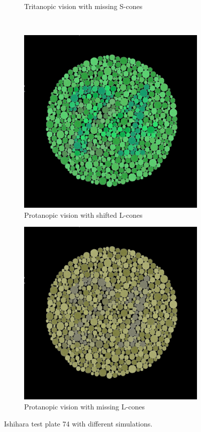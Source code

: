 \documentclass{sig-alternate-05-2015}
\begin{document}
\begin{figure}
\begin{subfigure}[t]{0.48\columnwidth}
        \caption{Tritanopic vision with missing S-cones}
    \end{subfigure}
    \\
    \begin{subfigure}[t]{0.48\columnwidth}
        \centering
        \includegraphics[width=\textwidth]{74_protanope.png}
        \caption{Protanopic vision with shifted L-cones}
    \end{subfigure}
    \begin{subfigure}[t]{0.48\columnwidth}
        \centering
        \includegraphics[width=\textwidth]{74_protanope_zero.png}
        \caption{Protanopic vision with missing L-cones}
    \end{subfigure}
    \caption{Ishihara test plate 74 with different simulations.}
    \label{fig:plate74}
\end{figure}
\end{document}
